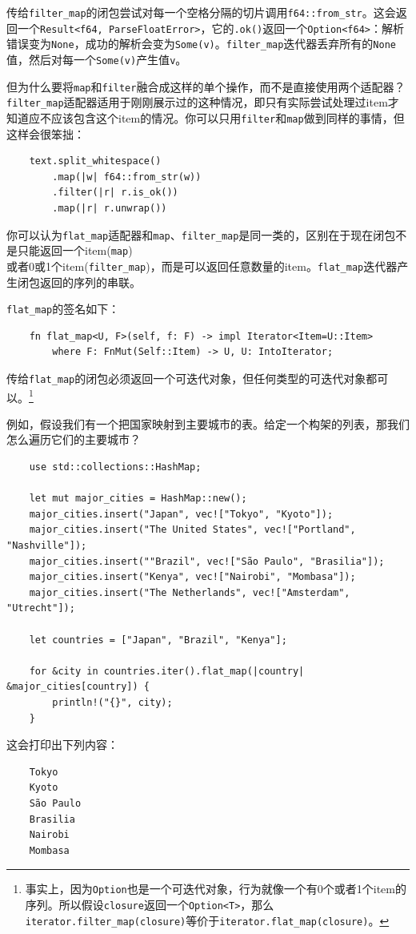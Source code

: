 传给\texttt{filter\_map}的闭包尝试对每一个空格分隔的切片调用\texttt{f64::from\_str}。这会返回一个\texttt{Result<f64, ParseFloatError>}，它的\texttt{.ok()}返回一个\texttt{Option<f64>}：解析错误变为\texttt{None}，成功的解析会变为\texttt{Some(v)}。\texttt{filter\_map}迭代器丢弃所有的\texttt{None}值，然后对每一个\texttt{Some(v)}产生值\texttt{v}。

但为什么要将\texttt{map}和\texttt{filter}融合成这样的单个操作，而不是直接使用两个适配器？\texttt{filter\_map}适配器适用于刚刚展示过的这种情况，即只有实际尝试处理过item才知道应不应该包含这个item的情况。你可以只用\texttt{filter}和\texttt{map}做到同样的事情，但这样会很笨拙：
\begin{verbatim}
    text.split_whitespace()
        .map(|w| f64::from_str(w))
        .filter(|r| r.is_ok())
        .map(|r| r.unwrap())
\end{verbatim}

你可以认为\texttt{flat\_map}适配器和\texttt{map}、\texttt{filter\_map}是同一类的，区别在于现在闭包不是只能返回一个item(\texttt{map})\\
或者0或1个item(\texttt{filter\_map})，而是可以返回任意数量的item。\texttt{flat\_map}迭代器产生闭包返回的序列的串联。

\texttt{flat\_map}的签名如下：
\begin{verbatim}
    fn flat_map<U, F>(self, f: F) -> impl Iterator<Item=U::Item>
        where F: FnMut(Self::Item) -> U, U: IntoIterator;
\end{verbatim}
传给\texttt{flat\_map}的闭包必须返回一个可迭代对象，但任何类型的可迭代对象都可以。\footnote{事实上，因为\texttt{Option}也是一个可迭代对象，行为就像一个有0个或者1个item的序列。所以假设\texttt{closure}返回一个\texttt{Option<T>}，那么\texttt{iterator.filter\_map(closure)}等价于\texttt{iterator.flat\_map(closure)}。}

例如，假设我们有一个把国家映射到主要城市的表。给定一个构架的列表，那我们怎么遍历它们的主要城市？
\begin{verbatim}
    use std::collections::HashMap;

    let mut major_cities = HashMap::new();
    major_cities.insert("Japan", vec!["Tokyo", "Kyoto"]);
    major_cities.insert("The United States", vec!["Portland", "Nashville"]);
    major_cities.insert(""Brazil", vec!["São Paulo", "Brasilia"]);
    major_cities.insert("Kenya", vec!["Nairobi", "Mombasa"]);
    major_cities.insert("The Netherlands", vec!["Amsterdam", "Utrecht"]);

    let countries = ["Japan", "Brazil", "Kenya"];

    for &city in countries.iter().flat_map(|country| &major_cities[country]) {
        println!("{}", city);
    }
\end{verbatim}
这会打印出下列内容：
\begin{verbatim}
    Tokyo
    Kyoto
    São Paulo
    Brasilia
    Nairobi
    Mombasa
\end{verbatim}

